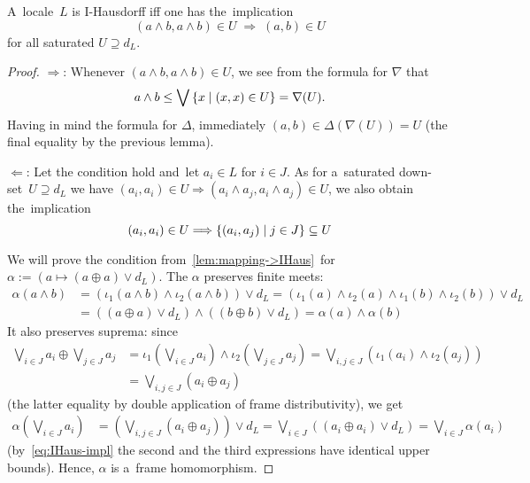 \begin{prop} \label{meets-in-satur}
  A~locale~$L$ is I-Hausdorff iff one has the~implication
  \[
    \left( a \wedge b, a \wedge b \right) \in U
    \; \Rightarrow \;
    \left( a, b \right) \in U
  \]
  for all saturated $U \supseteq d_L$.
\end{prop}
\begin{proof}
  $\Rightarrow$:
  Whenever $(a \wedge b, a \wedge b)\in U$, we see from the formula for
  $\nabla$ that
  \[
    a \wedge b \leq \bigvee \left\{ x \mid (x, x) \in U \right\} = \nabla(U).
  \]
  Having in mind the formula for $\Delta$, immediately $(a, b) \in \Delta(
  \nabla(U) ) = U$
  (the final equality by the previous lemma).

  $\Leftarrow$:
  Let the condition hold and~let $a_i\in L$ for $i\in J$. 
  As for a~saturated down-set~$U \supseteq d_L$ we have $(a_i, a_i) \in U
  \Rightarrow (a_i \wedge a_j, a_i \wedge a_j) \in U$, we also obtain
  the~implication
  \begin{equation} \label{eq:IHaus-impl}
    (a_i, a_i) \in U \Longrightarrow \{ (a_i, a_j) \mid j\in J \} \subseteq U
  \end{equation}

  We will prove the condition from~\ref{lem:mapping->IHaus}\, for
  $\alpha := (a \mapsto (a \oplus a) \vee d_L)$.
  The $\alpha$ preserves finite meets:
  \begin{align*}
    \alpha(a \wedge b)
    &= ( \iota_1(a\wedge b) \wedge \iota_2(a\wedge b) ) \vee d_L
    = (\iota_1(a)\wedge\iota_2(a)\wedge\iota_1(b)\wedge\iota_2(b)) \vee d_L \\
    &= ( (a\oplus a) \vee d_L ) \wedge ( (b\oplus b) \vee d_L)
    = \alpha(a) \wedge \alpha(b)
  \end{align*}
  It also preserves suprema:
  since
  \begin{align*}
    \bigvee_{i\in J} a_i \oplus \bigvee_{j\in J} a_j
    &= \iota_1 \left( \bigvee_{i\in J} a_i \right) \wedge \iota_2
    \left( \bigvee_{j\in J} a_j \right)
    = \bigvee_{i, j\in J} \left( \iota_1(a_i) \wedge \iota_2(a_j) \right) \\
    &= \bigvee_{i, j\in J} \left( a_i \oplus a_j \right)
  \end{align*}
  (the latter equality by double application of frame distributivity), we get
  \begin{align*}
    \alpha \left( \bigvee_{i\in J} a_i \right)
    &= \left(\bigvee_{i, j\in J} \left( a_i \oplus a_j \right)\right) \vee d_L
    = \bigvee_{i\in J} \left(\left( a_i \oplus a_i \right) \vee d_L \right)
    = \bigvee_{i\in J} \alpha \left( a_i \right)
  \end{align*}
  (by~\eqref{eq:IHaus-impl} the second and the third expressions have identical
  upper bounds).
  Hence, $\alpha$ is a~frame homomorphism.
\end{proof}


